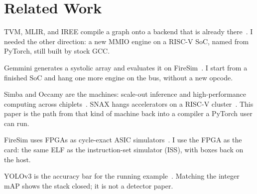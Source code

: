\section{Related Work}
\label{sec:related}


{TVM}, {MLIR}, and {IREE} compile a graph onto a backend that is
already there~\cite{chen2018tvm,lattner2021mlir,iree}.
I needed the other direction: a new {MMIO} engine on a {RISC-V}
{SoC}, named from {PyTorch}, still built by stock {GCC}.

Gemmini generates a systolic array and evaluates it on
FireSim~\cite{genc2021gemmini}.
I start from a finished {SoC} and hang one more engine on the bus,
without a new opcode.

Simba and Occamy are the machines: scale-out inference and
high-performance computing across
chiplets~\cite{shao2019simba,scheffler2025occamy}.
{SNAX} hangs accelerators on a {RISC-V}
cluster~\cite{antonio2025snax}.
This paper is the path from that kind of machine back into a compiler
a {PyTorch} user can run.

FireSim uses {FPGA}s as cycle-exact {ASIC}
simulators~\cite{karandikar2018firesim}.
I use the {FPGA} as the card: the same {ELF} as the instruction-set
simulator ({ISS}), with boxes back on the host.

{YOLOv3} is the accuracy bar for the running
example~\cite{redmon2018yolov3}.
Matching the integer {mAP} shows the stack closed; it is not a
detector paper.
